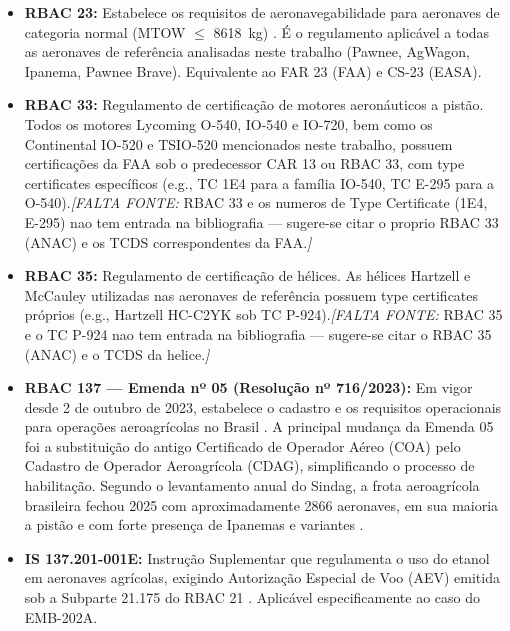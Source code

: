 \documentclass[a4paper,12pt]{article}
\newcommand{\citesugerida}[1]{{\color{red}\textit{[FALTA FONTE: }#1\textit{]}}}
\begin{document}
\begin{itemize}
    \item \textbf{RBAC 23:} Estabelece os requisitos de aeronavegabilidade para aeronaves de categoria normal (MTOW $\leq$ \SI{8618}{kg}) \cite{anacrbac23}. É o regulamento aplicável a todas as aeronaves de referência analisadas neste trabalho (Pawnee, AgWagon, Ipanema, Pawnee Brave). Equivalente ao FAR 23 (FAA) e CS-23 (EASA).
    
    \item \textbf{RBAC 33:} Regulamento de certificação de motores aeronáuticos a pistão. Todos os motores Lycoming O-540, IO-540 e IO-720, bem como os Continental IO-520 e TSIO-520 mencionados neste trabalho, possuem certificações da FAA sob o predecessor CAR 13 ou RBAC 33, com type certificates específicos (e.g., TC 1E4 para a família IO-540, TC E-295 para a O-540).\citesugerida{RBAC 33 e os numeros de Type Certificate (1E4, E-295) nao tem entrada na bibliografia --- sugere-se citar o proprio RBAC 33 (ANAC) e os TCDS correspondentes da FAA.}
    
    \item \textbf{RBAC 35:} Regulamento de certificação de hélices. As hélices Hartzell e McCauley utilizadas nas aeronaves de referência possuem type certificates próprios (e.g., Hartzell HC-C2YK sob TC P-924).\citesugerida{RBAC 35 e o TC P-924 nao tem entrada na bibliografia --- sugere-se citar o RBAC 35 (ANAC) e o TCDS da helice.}
    
    \item \textbf{RBAC 137 --- Emenda nº 05 (Resolução nº 716/2023):} Em vigor desde 2 de outubro de 2023, estabelece o cadastro e os requisitos operacionais para operações aeroagrícolas no Brasil \cite{anac137}. A principal mudança da Emenda 05 foi a substituição do antigo Certificado de Operador Aéreo (COA) pelo Cadastro de Operador Aeroagrícola (CDAG), simplificando o processo de habilitação. Segundo o levantamento anual do Sindag, a frota aeroagrícola brasileira fechou 2025 com aproximadamente \num{2866} aeronaves, em sua maioria a pistão e com forte presença de Ipanemas e variantes \cite{sindag_frota2025}. %
    
    \item \textbf{IS 137.201-001E:} Instrução Suplementar que regulamenta o uso do etanol em aeronaves agrícolas, exigindo Autorização Especial de Voo (AEV) emitida sob a Subparte 21.175 do RBAC 21 \cite{anacis137}. Aplicável especificamente ao caso do EMB-202A.
    

\end{itemize}
\end{document}
